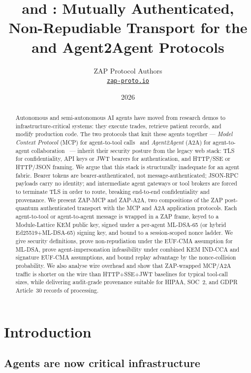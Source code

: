 \documentclass[11pt,a4paper]{article}
\title{\textbf{\zapmcp{} and \zapaa{}: Mutually Authenticated, Non-Repudiable
Transport for the \mcp{} and Agent2Agent Protocols}}
\author{ZAP Protocol Authors\\
\href{https://zap-proto.io}{\texttt{zap-proto.io}}}
\date{2026}
\theoremstyle{definition}
\theoremstyle{remark}
\newcommand{\zap}{\textsf{ZAP}\xspace}
\newcommand{\zapmcp}{\textsf{ZAP-MCP}\xspace}
\newcommand{\zapaa}{\textsf{ZAP-A2A}\xspace}
\newcommand{\mcp}{\textsf{MCP}\xspace}
\newcommand{\aatwo}{\textsf{A2A}\xspace}
\begin{document}
\maketitle

\begin{abstract}
Autonomous and semi-autonomous AI agents have moved from research demos to
infrastructure-critical systems: they execute trades, retrieve patient
records, and modify production code. The two protocols that knit these
agents together --- \emph{Model Context Protocol} (\mcp{}) for
agent-to-tool calls~\cite{mcp2024} and \emph{Agent2Agent} (\aatwo{}) for
agent-to-agent collaboration~\cite{a2a2025} --- inherit their security
posture from the legacy web stack: TLS for confidentiality, API keys or
JWT bearers for authentication, and HTTP/SSE or HTTP/JSON framing. We
argue that this stack is structurally inadequate for an agent
fabric. Bearer tokens are bearer-authenticated, not message-authenticated;
JSON-RPC payloads carry no identity; and intermediate agent gateways or
tool brokers are forced to terminate TLS in order to route, breaking
end-to-end confidentiality and provenance. We present \zapmcp{} and
\zapaa{}, two compositions of the \zap{} post-quantum authenticated
transport with the \mcp{} and \aatwo{} application protocols. Each
agent-to-tool or agent-to-agent message is wrapped in a \zap{} frame,
keyed to a Module-Lattice KEM public key, signed under a per-agent
ML-DSA-65 (or hybrid Ed25519+ML-DSA-65) signing key, and bound to a
session-scoped nonce ladder. We give security definitions, prove
non-repudiation under the EUF-CMA assumption for ML-DSA, prove
agent-impersonation infeasibility under combined KEM IND-CCA and signature
EUF-CMA assumptions, and bound replay advantage by the nonce-collision
probability. We also analyse wire overhead and show that \zap{}-wrapped
\mcp{}/\aatwo{} traffic is shorter on the wire than HTTP+SSE+JWT
baselines for typical tool-call sizes, while delivering audit-grade
provenance suitable for HIPAA, SOC~2, and GDPR Article~30 records of
processing.
\end{abstract}

\section{Introduction}

\subsection{Agents are now critical infrastructure}
\end{document}
